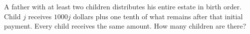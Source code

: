 A father with at least two children distributes his entire estate in birth order. Child $j$ receives $1000j$ dollars plus one tenth of what remains after that initial payment. Every child receives the same amount. How many children are there?
